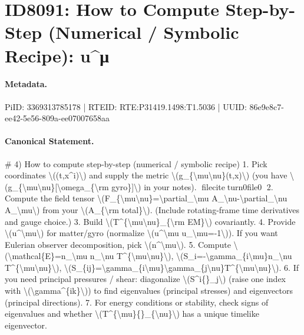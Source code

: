 \section*{ID8091: How to Compute Step-by-Step (Numerical / Symbolic Recipe): u\textasciicircum{}μ}
\paragraph{Metadata.}
PiID: 3369313785178 | RTEID: RTE:P31419.1498:T1.5036 | UUID: 86e9e8c7-ee42-5e56-809a-ee07007658aa

\paragraph{Canonical Statement.}
\# 4) How to compute step-by-step (numerical / symbolic recipe) 1. Pick coordinates \textbackslash{}((t,x\textasciicircum{}i)\textbackslash{}) and supply the metric \textbackslash{}(g\_\{\textbackslash{}mu\textbackslash{}nu\}(t,x)\textbackslash{}) (you have \textbackslash{}(g\_\{\textbackslash{}mu\textbackslash{}nu\}[\textbackslash{}omega\_\{\textbackslash{}rm gyro\}]\textbackslash{}) in your notes). fileciteturn0file0 2. Compute the field tensor \textbackslash{}(F\_\{\textbackslash{}mu\textbackslash{}nu\}=\textbackslash{}partial\_\textbackslash{}mu A\_\textbackslash{}nu-\textbackslash{}partial\_\textbackslash{}nu A\_\textbackslash{}mu\textbackslash{}) from your \textbackslash{}(A\_\{\textbackslash{}rm total\}\textbackslash{}). (Include rotating-frame time derivatives and gauge choice.) 3. Build \textbackslash{}(T\textasciicircum{}\{\textbackslash{}mu\textbackslash{}nu\}\_\{\textbackslash{}rm EM\}\textbackslash{}) covariantly. 4. Provide \textbackslash{}(u\textasciicircum{}\textbackslash{}mu\textbackslash{}) for matter/gyro (normalize \textbackslash{}(u\textasciicircum{}\textbackslash{}mu u\_\textbackslash{}mu=-1\textbackslash{})). If you want Eulerian observer decomposition, pick \textbackslash{}(n\textasciicircum{}\textbackslash{}mu\textbackslash{}). 5. Compute \textbackslash{}(\textbackslash{}mathcal\{E\}=n\_\textbackslash{}mu n\_\textbackslash{}nu T\textasciicircum{}\{\textbackslash{}mu\textbackslash{}nu\}\textbackslash{}), \textbackslash{}(S\_i=-\textbackslash{}gamma\_\{i\textbackslash{}mu\}n\_\textbackslash{}nu T\textasciicircum{}\{\textbackslash{}mu\textbackslash{}nu\}\textbackslash{}), \textbackslash{}(S\_\{ij\}=\textbackslash{}gamma\_\{i\textbackslash{}mu\}\textbackslash{}gamma\_\{j\textbackslash{}nu\}T\textasciicircum{}\{\textbackslash{}mu\textbackslash{}nu\}\textbackslash{}). 6. If you need principal pressures / shear: diagonalize \textbackslash{}(S\textasciicircum{}i\{\}\_j\textbackslash{}) (raise one index with \textbackslash{}(\textbackslash{}gamma\textasciicircum{}\{ik\}\textbackslash{})) to find eigenvalues (principal stresses) and eigenvectors (principal directions). 7. For energy conditions or stability, check signs of eigenvalues and whether \textbackslash{}(T\textasciicircum{}\{\textbackslash{}mu\}\{\}\_\{\textbackslash{}nu\}\textbackslash{}) has a unique timelike eigenvector.


